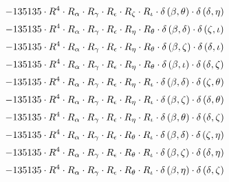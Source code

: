 \begin{subequations}
\begin{gather}
 \\[0.2em] \notag 		 - 135135 \cdot R^{4} \cdot R_{\alpha{}} \cdot R_{\gamma{}} \cdot R_{\epsilon{}} \cdot R_{\zeta{}} \cdot R_{\iota{}} \cdot \delta{}\left(\beta{}, \theta{}\right) \cdot \delta{}\left(\delta{}, \eta{}\right) 
 \\[0.2em] \notag 		 - 135135 \cdot R^{4} \cdot R_{\alpha{}} \cdot R_{\gamma{}} \cdot R_{\epsilon{}} \cdot R_{\eta{}} \cdot R_{\theta{}} \cdot \delta{}\left(\beta{}, \delta{}\right) \cdot \delta{}\left(\zeta{}, \iota{}\right) 
 \\[0.2em] \notag 		 - 135135 \cdot R^{4} \cdot R_{\alpha{}} \cdot R_{\gamma{}} \cdot R_{\epsilon{}} \cdot R_{\eta{}} \cdot R_{\theta{}} \cdot \delta{}\left(\beta{}, \zeta{}\right) \cdot \delta{}\left(\delta{}, \iota{}\right) 
 \\[0.2em] \notag 		 - 135135 \cdot R^{4} \cdot R_{\alpha{}} \cdot R_{\gamma{}} \cdot R_{\epsilon{}} \cdot R_{\eta{}} \cdot R_{\theta{}} \cdot \delta{}\left(\beta{}, \iota{}\right) \cdot \delta{}\left(\delta{}, \zeta{}\right) 
 \\[0.2em] \notag 		 - 135135 \cdot R^{4} \cdot R_{\alpha{}} \cdot R_{\gamma{}} \cdot R_{\epsilon{}} \cdot R_{\eta{}} \cdot R_{\iota{}} \cdot \delta{}\left(\beta{}, \delta{}\right) \cdot \delta{}\left(\zeta{}, \theta{}\right) 
 \\[0.2em] \notag 		 - 135135 \cdot R^{4} \cdot R_{\alpha{}} \cdot R_{\gamma{}} \cdot R_{\epsilon{}} \cdot R_{\eta{}} \cdot R_{\iota{}} \cdot \delta{}\left(\beta{}, \zeta{}\right) \cdot \delta{}\left(\delta{}, \theta{}\right) 
 \\[0.2em] \notag 		 - 135135 \cdot R^{4} \cdot R_{\alpha{}} \cdot R_{\gamma{}} \cdot R_{\epsilon{}} \cdot R_{\eta{}} \cdot R_{\iota{}} \cdot \delta{}\left(\beta{}, \theta{}\right) \cdot \delta{}\left(\delta{}, \zeta{}\right) 
 \\[0.2em] \notag 		 - 135135 \cdot R^{4} \cdot R_{\alpha{}} \cdot R_{\gamma{}} \cdot R_{\epsilon{}} \cdot R_{\theta{}} \cdot R_{\iota{}} \cdot \delta{}\left(\beta{}, \delta{}\right) \cdot \delta{}\left(\zeta{}, \eta{}\right) 
 \\[0.2em] \notag 		 - 135135 \cdot R^{4} \cdot R_{\alpha{}} \cdot R_{\gamma{}} \cdot R_{\epsilon{}} \cdot R_{\theta{}} \cdot R_{\iota{}} \cdot \delta{}\left(\beta{}, \zeta{}\right) \cdot \delta{}\left(\delta{}, \eta{}\right) 
 \\[0.2em] \notag 		 - 135135 \cdot R^{4} \cdot R_{\alpha{}} \cdot R_{\gamma{}} \cdot R_{\epsilon{}} \cdot R_{\theta{}} \cdot R_{\iota{}} \cdot \delta{}\left(\beta{}, \eta{}\right) \cdot \delta{}\left(\delta{}, \zeta{}\right) 

\end{gather}
\end{subequations}

